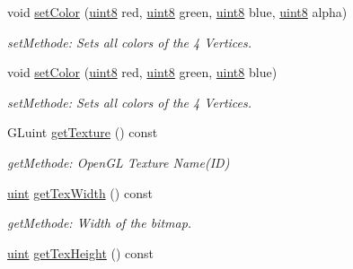 \begin{DoxyCompactItemize}
void \hyperlink{class_f2_c_1_1_sprite_base_a70ecaf3b26c6a7e1490d276895a82694}{setColor} (\hyperlink{namespace_f2_c_a711deb33697d145669b9c0c4fe87c7ca}{uint8} red, \hyperlink{namespace_f2_c_a711deb33697d145669b9c0c4fe87c7ca}{uint8} green, \hyperlink{namespace_f2_c_a711deb33697d145669b9c0c4fe87c7ca}{uint8} blue, \hyperlink{namespace_f2_c_a711deb33697d145669b9c0c4fe87c7ca}{uint8} alpha)
\begin{DoxyCompactList}\small\item\em setMethode: Sets all colors of the 4 Vertices. \item\end{DoxyCompactList}\item 
void \hyperlink{class_f2_c_1_1_sprite_base_ad28077e5723498e1257b461abd805395}{setColor} (\hyperlink{namespace_f2_c_a711deb33697d145669b9c0c4fe87c7ca}{uint8} red, \hyperlink{namespace_f2_c_a711deb33697d145669b9c0c4fe87c7ca}{uint8} green, \hyperlink{namespace_f2_c_a711deb33697d145669b9c0c4fe87c7ca}{uint8} blue)
\begin{DoxyCompactList}\small\item\em setMethode: Sets all colors of the 4 Vertices. \item\end{DoxyCompactList}\item 
\hypertarget{class_f2_c_1_1_sprite_base_a668a15b3c93514f7dffd7576b0ad71aa}{
GLuint \hyperlink{class_f2_c_1_1_sprite_base_a668a15b3c93514f7dffd7576b0ad71aa}{getTexture} () const }
\label{class_f2_c_1_1_sprite_base_a668a15b3c93514f7dffd7576b0ad71aa}

\begin{DoxyCompactList}\small\item\em getMethode: OpenGL Texture Name(ID) \item\end{DoxyCompactList}\item 
\hypertarget{class_f2_c_1_1_sprite_base_a38e5444bfd4600d0d32b5bfe7c5661d4}{
\hyperlink{namespace_f2_c_a58be2bac9eb3e3c99cb41b6008bf4fae}{uint} \hyperlink{class_f2_c_1_1_sprite_base_a38e5444bfd4600d0d32b5bfe7c5661d4}{getTexWidth} () const }
\label{class_f2_c_1_1_sprite_base_a38e5444bfd4600d0d32b5bfe7c5661d4}

\begin{DoxyCompactList}\small\item\em getMethode: Width of the bitmap. \item\end{DoxyCompactList}\item 
\hypertarget{class_f2_c_1_1_sprite_base_a12c777b014bd94631e0d232e97b069c6}{
\hyperlink{namespace_f2_c_a58be2bac9eb3e3c99cb41b6008bf4fae}{uint} \hyperlink{class_f2_c_1_1_sprite_base_a12c777b014bd94631e0d232e97b069c6}{getTexHeight} () const }
\label{class_f2_c_1_1_sprite_base_a12c777b014bd94631e0d232e97b069c6}


\end{DoxyCompactItemize}
